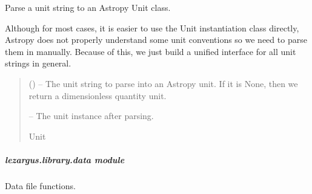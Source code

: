 \documentclass[letterpaper,11pt,english]{sphinxmanual}
\begin{document}
\begin{savenotes}\begin{fulllineitems}
\label{\detokenize{code/lezargus.library.conversion:lezargus.library.conversion.parse_unit_to_astropy_unit}}
\pysigstartsignatures
{}
\pysigstopsignatures
\sphinxAtStartPar
Parse a unit string to an Astropy Unit class.

\sphinxAtStartPar
Although for most cases, it is easier to use the Unit instantiation class
directly, Astropy does not properly understand some unit conventions so
we need to parse them in manually. Because of this, we just build a unified
interface for all unit strings in general.
\begin{quote}\begin{description}
\sphinxAtStartPar
{} () – The unit string to parse into an Astropy unit. If it is None, then we
return a dimensionless quantity unit.

\sphinxAtStartPar
{} – The unit instance after parsing.

\sphinxAtStartPar
Unit

\end{description}\end{quote}

\end{fulllineitems}\end{savenotes}


\sphinxstepscope


\subparagraph{lezargus.library.data module}
\label{\detokenize{code/lezargus.library.data:module-lezargus.library.data}}\label{\detokenize{code/lezargus.library.data:lezargus-library-data-module}}\label{\detokenize{code/lezargus.library.data::doc}}
\sphinxAtStartPar
Data file functions.
\end{document}
